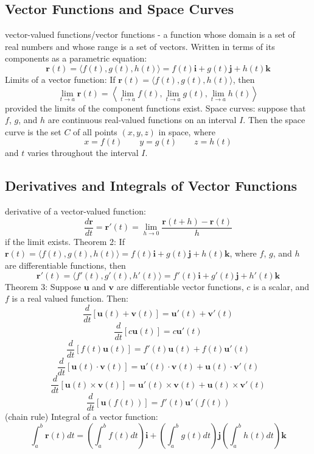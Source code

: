 \documentclass{article}
\begin{document}
    \subsection{Vector Functions and Space Curves} %
    \begin{outline}
        \1 vector-valued functions/vector functions - a function whose domain is a set of real numbers and whose range is a set of vectors. Written in terms of its components as a parametric equation: \[\mathbf r(t)=\langle f(t),g(t),h(t)\rangle=f(t)\mathbf i+g(t)\mathbf j+h(t)\mathbf k\]
        \1 Limits of a vector function: If \(\mathbf r(t)=\langle f(t),g(t),h(t)\rangle\), then \[\lim_{t\to a}\mathbf r(t)=\left\langle\lim_{t\to a}f(t),\lim_{t\to a}g(t),\lim_{t\to a}h(t)\right\rangle\] provided the limits of the component functions exist. 
        \1 Space curves: suppose that $f$, $g$, and $h$ are continuous real-valued functions on an interval $I$. Then the space curve is the set $C$ of all points \((x,y,z)\) in space, where \[x=f(t)\qquad y=g(t)\qquad z=h(t)\] and $t$ varies throughout the interval $I$. 
    \end{outline}
    \subsection{Derivatives and Integrals of Vector Functions}
    \begin{outline}
        \1 derivative of a vector-valued function: \[\dfrac{d\mathbf r}{dt}=\mathbf r'(t)=\lim_{h\to 0}\dfrac{\mathbf r(t+h)-\mathbf r(t)}{h}\] if the limit exists. 
        \1 Theorem 2: If \(\mathbf r(t)=\langle f(t),g(t),h(t)\rangle=f(t)\mathbf i+g(t)\mathbf j+h(t)\mathbf k\), where $f$, $g$, and $h$ are differentiable functions, then \[\mathbf r'(t)=\langle f'(t),g'(t),h'(t)\rangle =f'(t)\mathbf i+g'(t)\mathbf j+h'(t)\mathbf k\]
        \1 Theorem 3: Suppose $\mathbf u$ and $\mathbf v$ are differentiable vector functions, $c$ is a scalar, and $f$ is a real valued function. Then: 
            \2 \[\dfrac{d}{dt}[\mathbf u(t)+\mathbf v(t)]=\mathbf u'(t)+\mathbf v'(t)\]
            \2 \[\dfrac{d}{dt}[c\mathbf u(t)]=c\mathbf u'(t)\]
            \2 \[\dfrac{d}{dt}[f(t)\mathbf u(t)]=f'(t)\mathbf u(t)+f(t)\mathbf u'(t)\]
            \2 \[\dfrac{d}{dt}[\mathbf u(t)\cdot\mathbf v(t)]=\mathbf u'(t)\cdot\mathbf v(t)+\mathbf u(t)\cdot\mathbf v'(t)\]
            \2 \[\dfrac{d}{dt}[\mathbf u(t)\times\mathbf v(t)]=\mathbf u'(t)\times\mathbf v(t)+\mathbf u(t)\times\mathbf v'(t)\]
            \2 \[\dfrac{d}{dt}[\mathbf u(f(t))]=f'(t)\mathbf u'(f(t))\] (chain rule)
        \1 Integral of a vector function: \[\int^b_a\mathbf r(t)dt=\left(\int^b_af(t)dt\right)\mathbf i+\left(\int^b_ag(t)dt\right)\mathbf j\left(\int^b_ah(t)dt\right)\mathbf k\]
        
    \end{outline}
\end{document}
